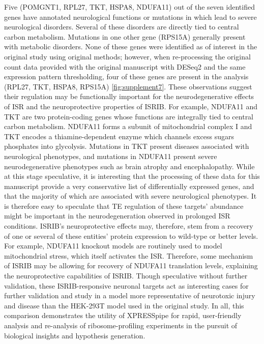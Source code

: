 \documentclass[10pt, oneside]{article}
\begin{document}
Five (POMGNT1, RPL27, TKT, HSPA8, NDUFA11) out of the seven identified genes have annotated neurological functions or mutations in which lead to severe neurological disorders. Several of these disorders are directly tied to central carbon metabolism. Mutations in one other gene (RPS15A) generally present with metabolic disorders. None of these genes were identified as of interest in the original study using original methods; however, when re-processing the original count data provided with the original manuscript with DESeq2 \cite{deseq2} and the same expression pattern thresholding, four of these genes are present in the analysis (RPL27, TKT, HSPA8, RPS15A) \ref{fig:supplement7}. These observations suggest their regulation may be functionally important for the neurodegenerative effects of ISR and the neuroprotective properties of ISRIB. For example, NDUFA11 and TKT are two protein-coding genes whose functions are integrally tied to central carbon metabolism. NDUFA11 forms a subunit of mitochondrial complex I and TKT encodes a thiamine-dependent enzyme which channels excess sugars phosphates into glycolysis. Mutations in TKT present diseases associated with neurological phenotypes, and mutations in NDUFA11 present severe neurodegenerative phenotypes such as brain atrophy and encephalopathy. While at this stage speculative, it is interesting that the processing of these data for this manuscript provide a very conservative list of differentially expressed genes, and that the majority of which are associated with severe neurological phenotypes. It is therefore easy to speculate that TE regulation of these targets' abundance might be important in the neurodegeneration observed in prolonged ISR conditions. ISRIB's neuroprotective effects may, therefore, stem from a recovery of one or several of these entities' protein expression to wild-type or better levels. For example, NDUFA11 knockout models are routinely used to model mitochondrial stress, which itself activates the ISR. Therefore, some mechanism of ISRIB may be allowing for recovery of NDUFA11 translation levels, explaining the neuroprotective capabilities of ISRIB. Though speculative without further validation, these ISRIB-responsive neuronal targets act as interesting cases for further validation and study in a model more representative of neurotoxic injury and disease than the HEK-293T model used in the original study. In all, this comparison demonstrates the utility of XPRESSpipe for rapid, user-friendly analysis and re-analysis of ribosome-profiling experiments in the pursuit of biological insights and hypothesis generation.\\
\end{document}
